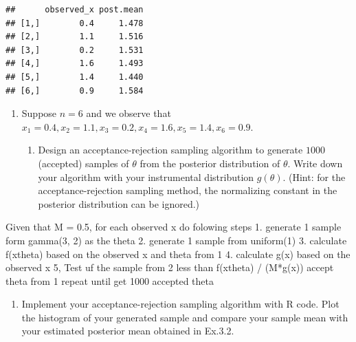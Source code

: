 \documentclass[
]{article}
\providecommand{\tightlist}{%
  \setlength{\itemsep}{0pt}\setlength{\parskip}{0pt}}
\begin{document}
\begin{verbatim}
##      observed_x post.mean
## [1,]        0.4     1.478
## [2,]        1.1     1.516
## [3,]        0.2     1.531
## [4,]        1.6     1.493
## [5,]        1.4     1.440
## [6,]        0.9     1.584
\end{verbatim}

\begin{enumerate}
\def\labelenumi{\arabic{enumi}.}
\setcounter{enumi}{2}
\tightlist
\item
  Suppose \(n=6\) and we observe that
  \(x_1=0.4, x_2=1.1, x_3=0.2, x_4=1.6, x_5=1.4, x_6=0.9\).

  \begin{enumerate}
  \def\labelenumii{\alph{enumii}.}
  \tightlist
  \item
    Design an acceptance-rejection sampling algorithm to generate
    \(1000\) (accepted) samples of \(\theta\) from the posterior
    distribution of \(\theta\). Write down your algorithm with your
    instrumental distribution \(g(\theta)\). (Hint: for the
    acceptance-rejection sampling method, the normalizing constant in
    the posterior distribution can be ignored.)
  \end{enumerate}
\end{enumerate}

Given that M = 0.5, for each observed x do folowing steps 1. generate 1
sample form gamma(3, 2) as the theta 2. generate 1 sample from
uniform(1) 3. calculate f(x\textbar theta) based on the observed x and
theta from 1 4. calculate g(x) based on the observed x 5, Test uf the
sample from 2 less than f(x\textbar theta) / (M*g(x)) accept theta from
1 repeat until get 1000 accepted theta

\begin{enumerate}
\def\labelenumi{\alph{enumi}.}
\setcounter{enumi}{1}
\tightlist
\item
  Implement your acceptance-rejection sampling algorithm with R code.
  Plot the histogram of your generated sample and compare your sample
  mean with your estimated posterior mean obtained in Ex.3.2.
\end{enumerate}
\end{document}
